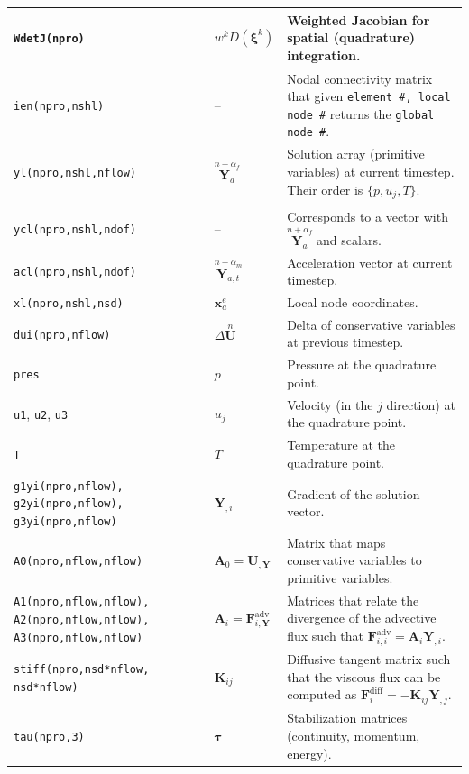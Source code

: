 \documentclass{ucb}
\begin{document}
\begin{longtable}[c]{m{} m{} m{}}
    \midrule
    \texttt{WdetJ(npro)} & $w^k D(\bm{\xi}^k)$ & Weighted Jacobian for spatial (quadrature) integration. \\
    \midrule
    \texttt{ien(npro,nshl)} & -- & Nodal connectivity matrix that given \texttt{element \#, local node \#} returns the \texttt{global node \#}. \\
    \midrule
    \texttt{yl(npro,nshl,nflow)} & $\overset{n+\alpha_f}{\bm{Y}_a}$ & Solution array (primitive variables) at current timestep. Their order is $\{p, u_j, T\}$. \\ \\
    \midrule
    \texttt{ycl(npro,nshl,ndof)} & -- & Corresponds to a vector with $\overset{n+\alpha_f}{\bm{Y}_a}$ and scalars. \\
    \midrule
    \texttt{acl(npro,nshl,ndof)} & $\overset{n+\alpha_m}{\bm{Y}_{a,t}}$ & Acceleration vector at current timestep. \\
    \midrule
    \texttt{xl(npro,nshl,nsd)} & $\bm{x}_a^e$ & Local node coordinates. \\
    \midrule
    \texttt{dui(npro,nflow)} & $\Delta\overset{n}{\bm{U}}$ & Delta of conservative variables at previous timestep. \\
    \midrule
    \texttt{pres} & $p$ & Pressure at the quadrature point. \\
    \midrule
    \texttt{u1}, \texttt{u2}, \texttt{u3} & $u_j$ & Velocity (in the $j$ direction) at the quadrature point. \\
    \midrule
    \texttt{T} & $T$ & Temperature at the quadrature point. \\
    \midrule
    \texttt{g1yi(npro,nflow), g2yi(npro,nflow), g3yi(npro,nflow)} & $\bm{Y}_{,i}$ & Gradient of the solution vector. \\
    \midrule
    \texttt{A0(npro,nflow,nflow)} & $\bm{A}_0 = \bm{U}_{,\bm{Y}}$ & Matrix that maps conservative variables to primitive variables. \\
    \midrule
    \texttt{A1(npro,nflow,nflow), A2(npro,nflow,nflow), A3(npro,nflow,nflow)} & $\bm{A}_i = \bm{F}_{i,\bm{Y}}^\mathrm{adv}$ & Matrices that relate the divergence of the advective flux such that $\bm{F}_{i,i}^\mathrm{adv} = \bm{A}_i \bm{Y}_{,i}$. \\
    \midrule
    \texttt{stiff(npro,nsd*nflow,} \texttt{nsd*nflow)} & $\bm{K}_{ij}$ & Diffusive tangent matrix such that the viscous flux can be computed as $\bm{F}_i^\mathrm{diff} = -\bm{K}_{ij} \bm{Y}_{,j}$. \\
    \midrule
    \texttt{tau(npro,3)} & $\bm{\tau}$ & Stabilization matrices (continuity, momentum, energy). \\

\end{longtable}
\end{document}
